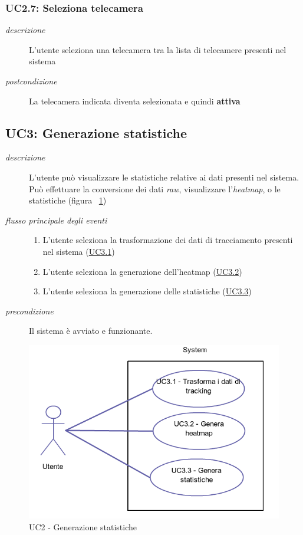   \subsubsection{UC2.7: Seleziona telecamera} \label{sec:uc2.7}
 \begin{description}
 \item[\em{descrizione}] L'utente seleziona una telecamera tra la lista di telecamere presenti nel sistema
  \item[\em{postcondizione}] La telecamera indicata diventa selezionata e quindi \textbf{attiva}
  
 \end{description}
 
 
 
\subsection{UC3: Generazione statistiche} \label{sec:uc3}
\begin{description}
 \item[\em{descrizione}] L'utente può visualizzare le statistiche relative ai dati presenti nel sistema. Può effettuare la conversione dei dati \textit{raw}, visualizzare l'\textit{heatmap}, o le statistiche (figura ~\ref{fig:uc3})

\item[\em{flusso principale degli eventi}] \mbox{}
 \begin{enumerate}
	\item L'utente seleziona la trasformazione dei dati di tracciamento presenti nel sistema (\hyperref[sec:uc3.1]{UC3.1})
	\item L'utente seleziona la generazione dell'heatmap (\hyperref[sec:uc3.2]{UC3.2})
	\item L'utente seleziona la generazione delle statistiche (\hyperref[sec:uc3.3]{UC3.3})
\end{enumerate}     
 
 \item[\em{precondizione}] Il sistema è avviato e funzionante.
  \end{description}
\begin{figure}[htpb]
\centering
\includegraphics[scale=0.4]{./images/uc3.png}
\caption{UC2 - Generazione statistiche}
\label{fig:uc3}
\end{figure}  
 
